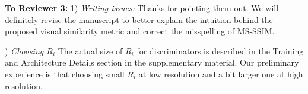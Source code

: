 \documentclass[10pt,twocolumn,letterpaper]{article}
\begin{document}
\noindent
\textbf{To Reviewer 3:} 1) \textit{Writing issues:} Thanks for pointing them out. We will definitely revise the manuscript to better explain the intuition behind the proposed visual similarity metric and correct the misspelling of MS-SSIM.

) \textit{Choosing $R_i$} The actual size of $R_i$ for discriminators is described in the Training and Architecture Details section in the supplementary material. Our preliminary experience is that choosing small $R_i$ at low resolution and a bit larger one at high resolution.




%		

%
%
%
\end{document}

